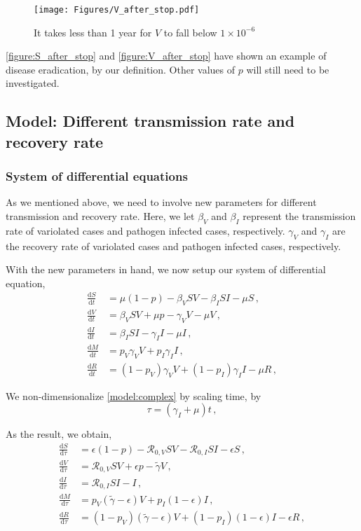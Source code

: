 \documentclass[12pt]{article}
\newcommand\dbyd[2]{\frac{\mathrm d{#1}}{\mathrm d{#2}}}
\newcommand{\R}{\mathcal{R}}
\newcommand{\pmV}{p_{V}}
\newcommand{\pmI}{p_{I}}
\begin{document}
\begin{figure}[H]
  \centering
  \texttt{[image: Figures/V\_after\_stop.pdf]}
  \caption{It takes less than 1 year for $V$ to fall below $1\times10^{-6}$}
\label{figure:V_after_stop}
\end{figure}

\autoref{figure:S_after_stop} and \autoref{figure:V_after_stop} have shown an example of disease eradication, by our definition. Other values of $p$ will still need to be investigated.

\subsection{Model: Different transmission rate and recovery rate}
\subsubsection{System of differential equations}
As we mentioned above, we need to involve new parameters for different transmission and recovery rate. Here, we let $\beta_V$ and $\beta_I$ represent the transmission rate of variolated cases and pathogen infected cases, respectively. $\gamma_V$ and $\gamma_I$ are the recovery rate of variolated cases and pathogen infected cases, respectively.

With the new parameters in hand, we now setup our system of differential equation,
\begin{equation}\label{model:complex}
\begin{split}
\dbyd{S}{t}&=\mu(1-p)- \beta_V SV -\beta_I SI-\mu S \,,\\
\dbyd{V}{t}&=\beta_V SV+\mu p-\gamma_V V -\mu V\,,\\
\dbyd{I}{t}&=\beta_I SI-\gamma_I I -\mu I\,,\\
\dbyd{M}{t}&=\pmV\gamma_V V+\pmI\gamma_I I\,,\\
\dbyd{R}{t}&=(1-\pmV)\gamma_V V+(1-\pmI)\gamma_I I-\mu R\,,
\end{split}
\end{equation}

We non-dimensionalize \autoref{model:complex} by scaling time, by
\begin{equation}
\tau=(\gamma_I+\mu)t \,,
\end{equation}

As the result, we obtain,
\begin{subequations}\label{eq:base_ODE}
\begin{align}
\dbyd{S}{\tau}&=\epsilon(1-p)-\R_{0,V} SV-\R_{0,I} SI-\epsilon S\,, \label{eq:S_by_tau}\\
\dbyd{V}{\tau}&=\R_{0,V} SV+\epsilon p-\tilde{\gamma} V\,, \label{eq:V_by_tau}\\
\dbyd{I}{\tau}&=\R_{0,I} SI-I\,, \label{eq:I_by_tau}\\
\dbyd{M}{\tau}&=\pmV(\tilde{\gamma}-\epsilon) V+\pmI(1-\epsilon) I\,,\\
\dbyd{R}{\tau}&=(1-\pmV)(\tilde{\gamma}-\epsilon) V+(1-\pmI)(1-\epsilon) I-\epsilon R\,,
\end{align}
\end{subequations}
\end{document}
